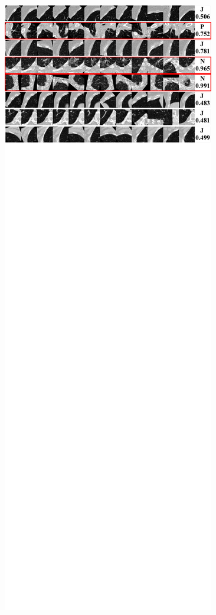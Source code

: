 \documentclass[onecolumn]{IEEEtran}
\begin{document}
\begin{figure}[H]
{\includegraphics[width=0.45\columnwidth]{./images/elcap-nodules-wall3}
}
\end{figure}

\newpage
\end{document}
